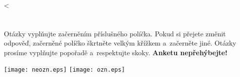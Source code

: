 \documentclass[fykos,\classoptions]{fksgeneric}%
\newcounter{questioNum}
\begin{document}
\loop\ifnum\teamN<\the\team%
\setcounter{questioNum}{0}%
\section{}
Otázky vyplňujte začerněním příslušného políčka. Pokud 
si přejete změnit odpověď, začerněné políčko škrtněte velkým křížkem 
a~začerněte jiné. Otázky prosíme vyplňujte popořadě a~respektujte skoky. {\bf Anketu nepřehýbejte!}%



\begin{center}
\quad \texttt{[image: neozn.eps]}\quad%
\quad \texttt{[image: ozn.eps]}\quad%
\quad {}\quad%
\end{center}



\end{document}
